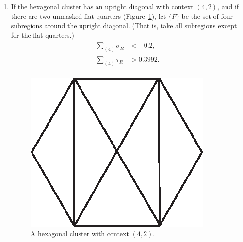 \begin{enumerate}
\item\label{app:hex7} If the hexagonal cluster has an upright
diagonal with context $(4,2)$, and if there are two unmasked flat
quarters (Figure~\ref{fig:hex42b}), let $\{F\}$ be the set of four
subregions around the upright diagonal. (That is, take all
subregions except for the flat quarters.)
    $$
    \begin{array}{lll}
    \sum_{(4)}\sigma_R^+ &< -0.2,\\
    \sum_{(4)}\tau_R^+ &> 0.3992.\\
    \end{array}
    $$
\begin{figure}[htb]
  \centering
  \includegraphics{PS/hex42b.eps}
  \caption{A hexagonal cluster with context $(4,2)$.}
  \label{fig:hex42b}
\end{figure}


\end{enumerate}
